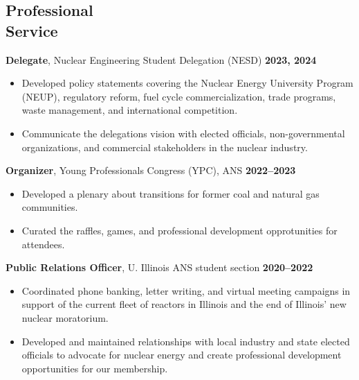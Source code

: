 \documentclass[margin,line]{resume}
\begin{document}
\begin{resume}
    \section{\mysidestyle Professional\\Service}
    \textbf{Delegate}, Nuclear Engineering Student Delegation (NESD) \hfill \textbf{2023, 2024}\vspace{.5mm}\\%
    \begin{itemize}
        \item Developed policy statements covering the Nuclear Energy University Program (NEUP), regulatory reform, fuel cycle commercialization, trade programs, waste management, and international competition.
        \item Communicate the delegations vision with elected officials, non-governmental organizations, and commercial stakeholders in the nuclear industry.
    \end{itemize}
    \textbf{Organizer}, Young Professionals Congress (YPC), ANS \hfill \textbf{2022--2023}\vspace{.5mm}\\%
    \begin{itemize}
        \item Developed a plenary about transitions for former coal and natural gas communities.
        \item Curated the raffles, games, and professional development opprotunities for attendees.
    \end{itemize}
    \textbf{Public Relations Officer}, U. Illinois ANS student section  \hfill \textbf{2020--2022}\vspace{.5mm}\\%
    \begin{itemize}
        \item Coordinated phone banking, letter writing, and virtual meeting campaigns in support of the current fleet of reactors in Illinois and the end of Illinois' new nuclear moratorium.
        \item Developed and maintained relationships with local industry and state elected officials to advocate for nuclear energy and create professional development opportunities for our membership.
    \end{itemize}
\end{resume}
\end{document}

